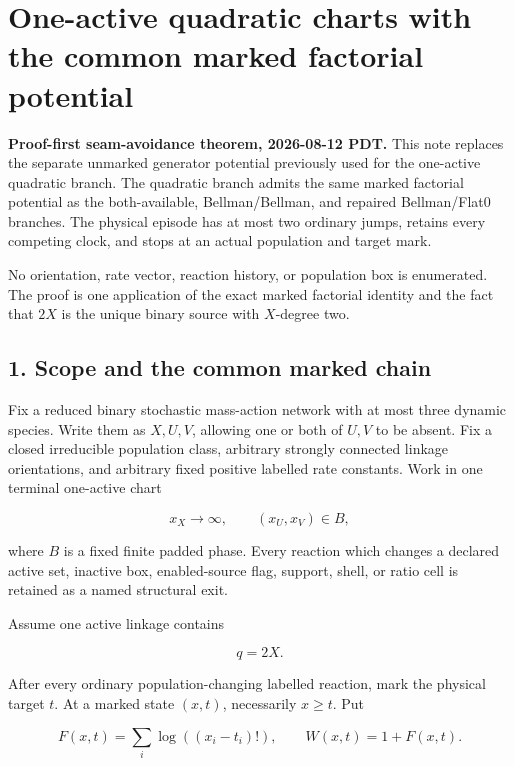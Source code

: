 \section{One-active quadratic charts with the common marked factorial
potential}

\textbf{Proof-first seam-avoidance theorem, 2026-08-12 PDT.} This note
replaces the separate unmarked generator potential previously used for
the one-active quadratic branch. The quadratic branch admits the same
marked factorial potential as the both-available, Bellman/Bellman, and
repaired Bellman/Flat0 branches. The physical episode has at most two
ordinary jumps, retains every competing clock, and stops at an actual
population and target mark.

No orientation, rate vector, reaction history, or population box is
enumerated. The proof is one application of the exact marked factorial
identity and the fact that \(2X\) is the unique binary source with
\(X\)-degree two.

\subsection{1. Scope and the common marked
chain}

Fix a reduced binary stochastic mass-action network with at most three
dynamic species. Write them as \(X,U,V\), allowing one or both of
\(U,V\) to be absent. Fix a closed irreducible population class,
arbitrary strongly connected linkage orientations, and arbitrary fixed
positive labelled rate constants. Work in one terminal one-active chart

\[
             x_X\longrightarrow\infty,
             \qquad (x_U,x_V)\in B,                         \tag{1.1}
\]

where \(B\) is a fixed finite padded phase. Every reaction which changes
a declared active set, inactive box, enabled-source flag, support,
shell, or ratio cell is retained as a named structural exit.

Assume one active linkage contains

\[
                              q=2X.                         \tag{1.2}
\]

After every ordinary population-changing labelled reaction, mark the
physical target \(t\). At a marked state \((x,t)\), necessarily
\(x\ge t\). Put

\[
 F(x,t)=\sum_i\log((x_i-t_i)!),
 \qquad W(x,t)=1+F(x,t).                                  \tag{1.3}
\]

